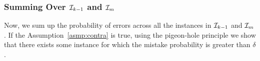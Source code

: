 \subsubsection{Summing Over $\mathcal{I}_{k-1}$ and $\mathcal{I}_m$}
Now, we sum up the probability of errors across all the instances in $\mathcal{I}_{k-1}$ and $\mathcal{I}_m$.
If the Assumption~\ref{asmp:contra} is true, using the pigeon-hole principle we show that
there exists some instance for which the mistake probability is greater than $\delta$.

